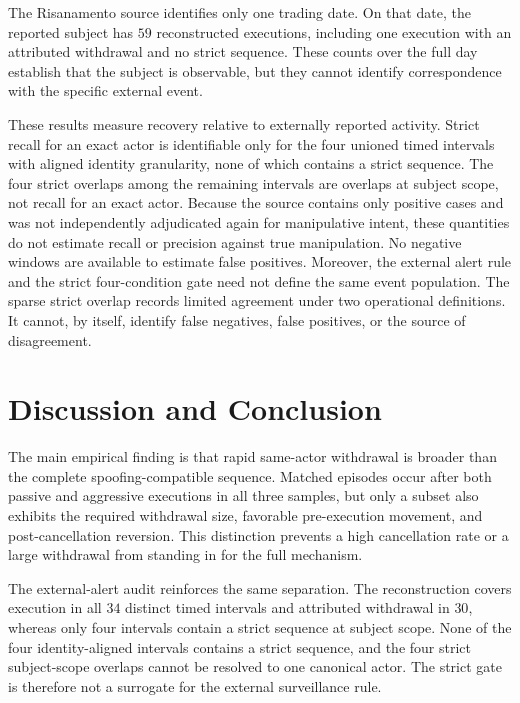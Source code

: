 \documentclass[11pt]{article}
\newenvironment{review}{\begingroup\color{blue}}{\endgroup}
\begin{document}
The Risanamento source identifies only one trading date. On that date, the reported subject has $59$ reconstructed
executions, including one execution with an attributed withdrawal and no strict sequence. \begin{review}These counts over the full day\end{review} establish that the
subject is observable, but they cannot identify correspondence with the specific external event.

These results measure recovery relative to externally reported activity. \begin{review}Strict recall for an exact actor is identifiable only for the four unioned timed intervals with aligned identity granularity, none of which contains a strict sequence.\end{review} The four strict overlaps among
the remaining intervals are \begin{review}overlaps at subject scope, not recall for an exact actor\end{review}. Because \begin{review}the source contains only positive cases and was not independently adjudicated again for manipulative intent\end{review}, these quantities do not estimate recall or precision against true
manipulation. No negative windows are available to estimate false positives. Moreover, the external alert rule and the strict
four-condition gate need not define the same event population. The sparse strict overlap records limited agreement under two
operational definitions. It cannot, by itself, identify false negatives, false positives, or the source of disagreement.
\FloatBarrier

\section{Discussion and Conclusion}
\label{sec:discussion_conclusion}

The main empirical finding is that rapid same-actor withdrawal is broader than the complete spoofing-compatible sequence.
Matched episodes occur after both passive and aggressive executions in all three samples, but only a subset also exhibits the
required withdrawal size, favorable pre-execution movement, and post-cancellation reversion. This distinction prevents a
high cancellation rate or a large withdrawal from standing in for the full mechanism.

The external-alert audit reinforces the same separation. The reconstruction covers execution in all $34$ distinct timed
intervals and attributed withdrawal in $30$, whereas only four intervals contain a strict sequence at subject scope. None of
the four identity-aligned intervals contains a strict sequence, and the four strict subject-scope overlaps cannot be resolved
to one canonical actor. The strict gate is therefore not a surrogate for the external surveillance rule.
\end{document}

